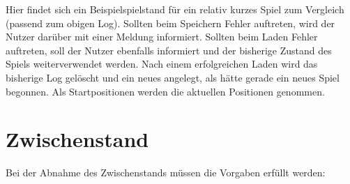         Hier findet sich ein Beispielspielstand für ein relativ kurzes Spiel zum Vergleich (passend zum obigen Log).
        Sollten beim Speichern Fehler auftreten, wird der Nutzer darüber mit einer Meldung informiert.
        Sollten beim Laden Fehler auftreten, soll der Nutzer ebenfalls informiert und der bisherige Zustand des Spiels weiterverwendet werden. Nach einem erfolgreichen Laden wird das bisherige Log gelöscht und ein neues angelegt, als hätte gerade ein neues Spiel begonnen.
        Als Startpositionen werden die aktuellen Positionen genommen.

    \section{Zwischenstand}
        Bei der Abnahme des Zwischenstands müssen die Vorgaben erfüllt werden:
